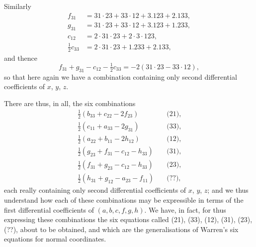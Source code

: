 \documentclass[11pt,a4paper]{article}
\theoremstyle{definition}
\theoremstyle{remark}
\begin{document}
Similarly
\[
\begin{aligned}
f_{31} &= 31 \cdot 23 + 33 \cdot 12 + 3.123 + 2.133, \\
g_{31} &= 31 \cdot 23 + 33 \cdot 12 + 3.123 + 1.233, \\
c_{12} &= 2 \cdot 31 \cdot 23 + 2 \cdot 3 \cdot 123, \\
\tfrac{1}{2}c_{33} &= 2 \cdot 31 \cdot 23 + 1.233 + 2.133,
\end{aligned}
\]
and thence
\[
f_{31} + g_{31} - c_{12} - \tfrac{1}{2}c_{33} = -2(31 \cdot 23 - 33 \cdot 12),
\]
so that here again we have a combination containing only second differential coefficients of $x$, $y$, $z$.

There are thus, in all, the six combinations
\[
\begin{aligned}
\tfrac{1}{2}(b_{33} + c_{22} - 2f_{23}) &\quad \text{(21)}, \\
\tfrac{1}{2}(c_{11} + a_{33} - 2g_{31}) &\quad \text{(33)}, \\
\tfrac{1}{2}(a_{22} + b_{11} - 2h_{12}) &\quad \text{(12)}, \\
\tfrac{1}{2}(g_{23} + f_{31} - c_{12} - h_{33}) &\quad \text{(31)}, \\
\tfrac{1}{2}(f_{31} + g_{23} - c_{12} - h_{33}) &\quad \text{(23)}, \\
\tfrac{1}{2}(h_{31} + g_{12} - a_{23} - f_{11}) &\quad \text{(??)},
\end{aligned}
\]
each really containing only second differential coefficients of $x$, $y$, $z$; and we thus understand how each of these combinations may be expressible in terms of the first differential coefficients of $(a, b, c, f, g, h)$. We have, in fact, for thus expressing these combinations the six equations called (21), (33), (12), (31), (23), (??), about to be obtained, and which are the generalisations of Warren's six equations for normal coordinates.
\end{document}
